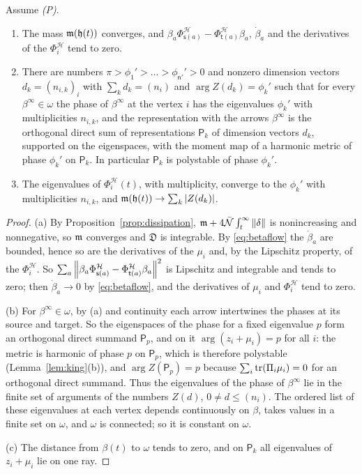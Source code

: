 \begin{lemma}\label{lem:limitset}
Assume \emph{(P)}.
\begin{enumerate}
\item[(a)] The mass $\mathfrak m(\mathfrak h(t))$ converges, and
 $\beta_a\Phi^{\mathcal H}_{\mathsf s(a)}-\Phi^{\mathcal H}_{\mathsf t(a)}\beta_a$,
 $\dot\beta_a$ and the derivatives of the $\Phi^{\mathcal H}_i$ tend to
 zero.
\item[(b)] There are numbers $\pi>\phi_1'>\dots>\phi_{\mathsf n'}'>0$ and
 nonzero dimension vectors $d_k=(n_{i,k})_i$ with $\sum_kd_k=(n_i)$ and
 $\arg Z(d_k)=\phi_k'$ such that for every $\beta^\infty\in\omega$ the phase
 of $\beta^\infty$ at the vertex $i$ has the eigenvalues $\phi_k'$ with
 multiplicities $n_{i,k}$, and the representation with the arrows
 $\beta^\infty$ is the orthogonal direct sum of representations
 $\mathsf P_k$ of dimension vectors $d_k$, supported on the eigenspaces,
 with the moment map of a harmonic metric of phase $\phi_k'$ on
 $\mathsf P_k$. In particular $\mathsf P_k$ is polystable of phase
 $\phi_k'$.
\item[(c)] The eigenvalues of $\Phi^{\mathcal H}_i(t)$, with multiplicity,
 converge to the $\phi_k'$ with multiplicities $n_{i,k}$, and
 $\mathfrak m(\mathfrak h(t))\to\sum_k|Z(d_k)|$.
\end{enumerate}
\end{lemma}

\begin{proof}
(a) By Proposition~\ref{prop:dissipation},
$\mathfrak m+4\bar{\mathcal N}\int_t^\infty\left\lVert\delta\right\rVert$ is nonincreasing and nonnegative,
so $\mathfrak m$ converges and $\mathfrak D$ is integrable. By
\eqref{eq:betaflow} the $\dot\beta_a$ are bounded, hence so are the
derivatives of the $\mu_i$ and, by the Lipschitz property, of the
$\Phi^{\mathcal H}_i$. So
$\sum_a\left\lVert\beta_a\Phi^{\mathcal H}_{\mathsf s(a)}-\Phi^{\mathcal H}_{\mathsf t(a)}\beta_a\right\rVert^2$
is Lipschitz and integrable and tends to zero; then $\dot\beta_a\to0$ by
\eqref{eq:betaflow}, and the derivatives of $\mu_i$ and
$\Phi^{\mathcal H}_i$ tend to zero.

(b) For $\beta^\infty\in\omega$, by (a) and continuity each arrow
intertwines the phases at its source and target. So the eigenspaces of the
phase for a fixed eigenvalue $p$ form an orthogonal direct summand
$\mathsf P_p$, and on it $\arg(z_i+\mu_i)=p$ for all $i$: the metric is
harmonic of phase $p$ on $\mathsf P_p$, which is therefore polystable
(Lemma~\ref{lem:king}(b)), and $\arg Z(\mathsf P_p)=p$ because
$\sum_i\operatorname{tr}(\Pi_i\mu_i)=0$ for an orthogonal direct summand. Thus the
eigenvalues of the phase of $\beta^\infty$ lie in the finite set of
arguments of the numbers $Z(d)$, $0\neq d\leq(n_i)$. The ordered list of
these eigenvalues at each vertex depends continuously on $\beta$, takes
values in a finite set on $\omega$, and $\omega$ is connected; so it is
constant on $\omega$.

(c) The distance from $\beta(t)$ to $\omega$ tends to zero, and on
$\mathsf P_k$ all eigenvalues of $z_i+\mu_i$ lie on one ray.
\end{proof}

